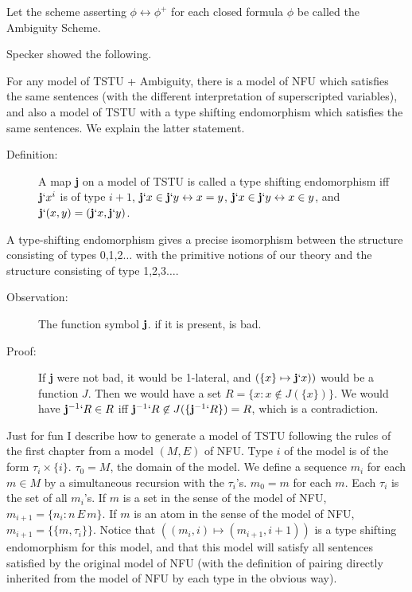\documentclass[12pt]{article}
\begin{document}
Let the scheme asserting $\phi \leftrightarrow \phi^+$ for each closed formula $\phi$ be called the Ambiguity Scheme.

Specker showed the following.

For any model of TSTU + Ambiguity, there is a model of NFU which satisfies the same sentences (with the different interpretation of superscripted variables), and also a model of
TSTU with a type shifting endomorphism which satisfies the same sentences.  We explain the latter statement.

\begin{description}

\item[Definition:]  A map {\bf j} on a model of TSTU is called a type shifting endomorphism iff ${\bf j}`x^i$ is of type $i+1$, ${\bf j}`x \in {\bf j}`y \leftrightarrow x=y$, ${\bf j}`x \in {\bf j}`y \leftrightarrow x \in y$,
and ${\bf j}`(x,y) = ({\bf j}`x,{\bf j}`y)$.

\end{description}

A type-shifting endomorphism gives a precise isomorphism between the structure consisting of types 0,1,2$\ldots$ with the primitive notions of our theory and the structure consisting of type 1,2,3$\ldots$.

\begin{description}

\item[Observation:]  The function symbol ${\bf j}$. if it is present, is bad.

\item[Proof:]  If {\bf j} were not bad, it would be 1-lateral, and $(\{x\} \mapsto {\bf j}`x))$ would be a function $J$.  Then we would have a set $R = \{x:x \not\in J(\{x\})\}$.  We would have
${\bf j}^{-1}`R \in R$ iff ${\bf j}^{-1}`R \not\in J(\{{\bf j}^{-1}`R\}) = R$, which is a contradiction.

\end{description}

Just for fun I describe how to generate a model of TSTU following the rules of the first chapter from a model $(M,E)$ of NFU.   Type $i$ of the model is of the form $\tau_i \times \{i\}$.
$\tau_0 = M$, the domain of the model.  We define a sequence $m_i$ for each $m \in M$ by a simultaneous recursion with the $\tau_i$'s.  $m_0 = m$ for each $m$.  Each $\tau_i$ is the set of
all $m_i$'s.  If $m$ is a set in the sense of the model of NFU, $m_{i+1} = \{n_i:n \, E\,m\}$.  If $m$ is an atom in the sense of the model of NFU, $m_{i+1} = \{\{m,\tau_i\}\}$.  Notice that
$((m_i,i) \mapsto (m_{i+1},i+1))$ is a type shifting endomorphism for this model, and that this model will satisfy all sentences satisfied by the original model of NFU (with the definition of pairing directly inherited from the model of NFU by each type in the obvious way).
\end{document}
